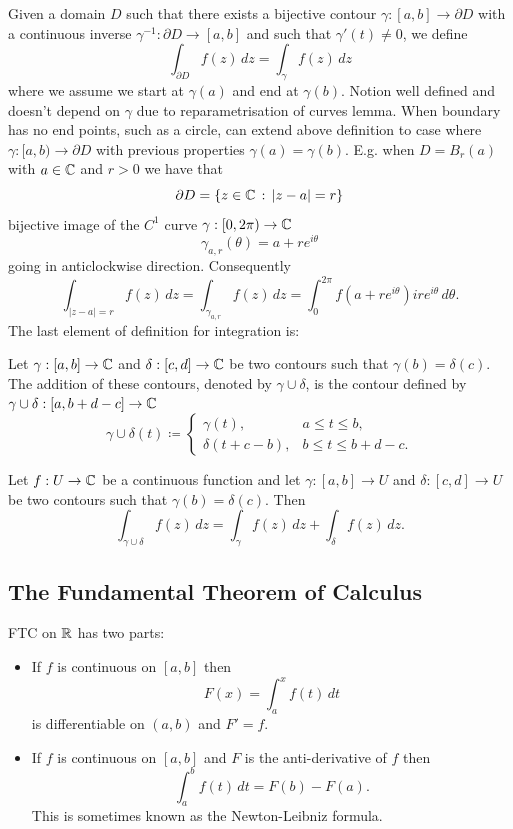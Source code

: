 \documentclass[10pt, a4paper]{article}
\begin{document}
Given a domain $D$ such that there exists a bijective contour $\gamma : [a, b] \to \partial D$ with a continuous inverse $\gamma ^ {-1} : \partial D \to [a, b]$ and such that $\gamma'(t) \neq 0$,
we define
\[
\int_{\partial D}f(z)\,dz = \int_{\gamma}f(z)\,dz
\]
where we assume we start at $\gamma(a)$ and end at $\gamma(b)$.
Notion well defined and doesn't depend on $\gamma$ due to reparametrisation of curves lemma.
When boundary has no end points,
such as a circle,
can extend above definition to case where $\gamma : [a, b) \to \partial D$ with previous properties $\gamma(a) = \gamma(b)$.
E.g.
when $D = B_r(a)$ with $a \in \mathbb{C}$ and $r > 0$ we have that
\[
\partial D = \{z \in \mathbb{C}\,:\,|z - a| = r\}
\]
bijective image of the $C ^ 1$ curve $\gamma : [0, 2\pi) \to \mathbb{C}$
\[
\gamma_{a, r}(\theta) = a + re ^ {i\theta}
\]
going in anticlockwise direction.
Consequently
\[
\int_{|z - a| = r}f(z)\,dz = \int_{\gamma_{a, r}}f(z)\,dz = \int_{0}^{2\pi}f(a + re ^ {i\theta})ire ^ {i\theta}\,d\theta.
\]
The last element of definition for integration is:

\begin{definition}
    Let $\gamma : [a, b] \to \mathbb{C}$ and $\delta : [c, d] \to \mathbb{C}$ be two contours such that $\gamma(b) = \delta(c)$.
    The addition of these contours,
    denoted by $\gamma \cup \delta$,
    is the contour defined by $\gamma \cup \delta : [a, b + d - c] \to \mathbb{C}$
    \[
    \gamma \cup \delta(t) \coloneqq \begin{cases}
        \gamma(t), &a \leq t \leq b, \\
        \delta(t + c - b), & b \leq t \leq b + d - c.
    \end{cases}
    \]
\end{definition}

\begin{lemma}
    Let $f : U \to \mathbb{C}$ be a continuous function and let $\gamma : [a, b] \to U$ and $\delta : [c, d] \to U$ be two contours such that $\gamma(b) = \delta(c)$.
    Then
    \[
    \int_{\gamma \cup \delta}f(z)\,dz = \int_{\gamma}f(z)\,dz + \int_{\delta}f(z)\,dz.
    \]
\end{lemma}

\subsection{The Fundamental Theorem of Calculus}
FTC on $\mathbb{R}$ has two parts:
\begin{itemize}
    \item If $f$ is continuous on $[a, b]$ then
    \[
    F(x) = \int_{a}^{x}f(t)\,dt
    \]
    is differentiable on $(a, b)$ and $F' = f$.

    \item If $f$ is continuous on $[a, b]$ and $F$ is the anti-derivative of $f$ then
    \[
    \int_{a}^{b}f(t)\,dt = F(b) - F(a).
    \]
    This is sometimes known as the Newton-Leibniz formula.
\end{itemize}
\end{document}
